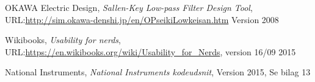 \begin{thebibliography}{9}
	
	OKAWA Electric Design,
	\emph{Sallen-Key Low-pass Filter Design Tool},
	URL:\url{http://sim.okawa-denshi.jp/en/OPseikiLowkeisan.htm}
	Version 2008
	
	Wikibooks,
	\emph{Usability for nerds},
	URL:\url{https://en.wikibooks.org/wiki/Usability_for_Nerds},
	version 16/09 2015 
	
	National Instruments,
	\emph{National Instruments kodeudsnit},
	Version 2015,
	Se bilag 13
	
	
\end{thebibliography}

